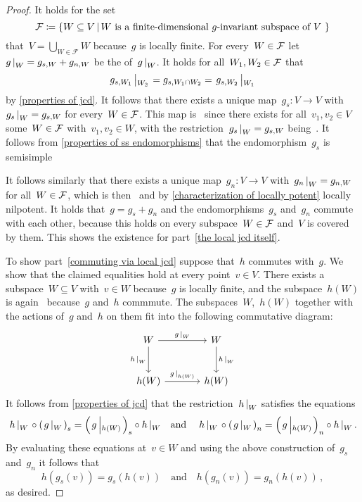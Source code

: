 \begin{proof}
  \label{local jcd proof}
  It holds for the set
  \[
              \mc{F}
    \defined  \left\{
                W \subseteq V
              \suchthat*
                \text{$W$ is a {\fd}~\dash{$g$}{invariant} subspace of~$V$}\ 
              \right\}
  \]
  that~$V = \bigcup_{W \in \mathcal{F}} W$ because~$g$ is locally finite.
  For every~$W \in \mathcal{F}$ let~$\restrict{g}{W} = g_{s,W} + g_{n,W}$ be the {\JCD} of~$\restrict{g}{W}$.
  It holds for all~$W_1, W_2 \in \mathcal{F}$ that
  \[
      \restrict*{g_{s,W_1}}{W_2}
    = g_{s, W_1 \cap W_2}
    = \restrict*{g_{s,W_2}}{W_1}
  \]
  by \cref{properties of jcd}.
  It follows that there exists a unique map~$g_s \colon V \to V$ with~$\restrict{g_s}{W} = g_{s,W}$ for every~$W \in \mathcal{F}$.
  This map is~ since there exists for all~$v_1, v_2 \in V$ some~$W \in \mathcal{F}$ with~$v_1, v_2 \in W$, with the restriction~$\restrict{g_s}{W} = g_{s,W}$ being~\dash{$k$}{linear}.
  It follows from \cref{properties of ss endomorphisms} that the endomorphism~$g_s$ is semisimple
  
  It follows similarly that there exists a unique map~$g_n \colon V \to V$ with~$\restrict{g_n}{W} = g_{n,W}$ for all~$W \in \mathcal{F}$, which is then~ and by \cref{characterization of locally potent} locally nilpotent.
  It holds that~$g = g_s + g_n$ and the endomorphisms~$g_s$ and~$g_n$ commute with each other, because this holds on every subspace~$W \in \mathcal{F}$ and~$V$ is covered by them.
  This shows the existence for part~\ref*{the local jcd itself}.
  
  To show part~\ref*{commuting via local jcd} suppose that~$h$ commutes with~$g$.
  We show that the claimed equalities hold at every point~$v \in V$.
  There exists a {\fd}~ subspace~$W \subseteq V$ with~$v \in W$ because~$g$ is locally finite, and the subspace~$h(W)$ is again~\dash{$g$}{invariant} because~$g$ and~$h$ commmute.
  The subspaces~$W$,~$h(W)$ together with the actions of~$g$ and~$h$ on them fit into the following commutative diagram:
  \[
    \begin{tikzcd}[sep = large]
        W
        \arrow{r}[above]{\restrict{g}{W}}
        \arrow{d}[left]{\restrict{h}{W}}
      & W
        \arrow{d}[right]{\restrict{h}{W}}
      \\
        h(W)
        \arrow{r}[above]{\restrict{g}{h(W)}}
      & h(W)
    \end{tikzcd}
  \]
  It follows from \cref{properties of jcd} that the restriction~$\restrict{h}{W}$ satisfies the equations
  \[
      \restrict*{h}{W} \circ \left( \restrict*{g}{W} \right)_s
    = \left( \restrict*{g}{h(W)} \right)_s \circ \restrict{h}{W}
    \quad\text{and}\quad
      \restrict*{h}{W} \circ \left( \restrict*{g}{W} \right)_n
    = \left( \restrict*{g}{h(W)} \right)_n \circ \restrict{h}{W} \,.
  \]
  By evaluating these equations at~$v \in W$ and using the above construction of~$g_s$ and~$g_n$ it follows that
  \[
      h(g_s(v))
    = g_s(h(v))
    \quad\text{and}\quad
      h(g_n(v))
    = g_n(h(v)) \,,
  \]
  as desired.


\end{proof}
